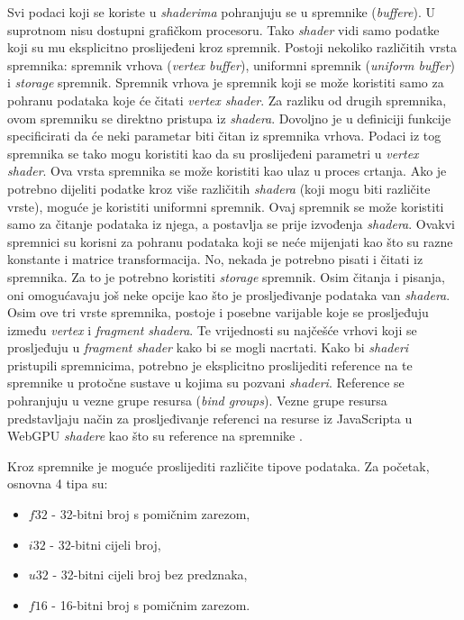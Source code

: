 \documentclass{foi}
\begin{document}
 
Svi podaci koji se koriste u \textit{shaderima} pohranjuju se u spremnike (\textit{buffere}). U suprotnom nisu dostupni grafičkom procesoru. Tako \textit{shader} vidi samo podatke koji su mu eksplicitno proslijeđeni kroz spremnik. Postoji nekoliko različitih vrsta spremnika: spremnik vrhova (\textit{vertex buffer}), uniformni spremnik (\textit{uniform buffer}) i \textit{storage} spremnik. Spremnik vrhova je spremnik koji se može koristiti samo za pohranu podataka koje će čitati \textit{vertex shader}. Za razliku od drugih spremnika, ovom spremniku se direktno pristupa iz \textit{shadera}. Dovoljno je u definiciji funkcije specificirati da će neki parametar biti čitan iz spremnika vrhova. Podaci iz tog spremnika se tako mogu koristiti kao da su proslijeđeni parametri u \textit{vertex shader}. Ova vrsta spremnika se može koristiti kao ulaz u proces crtanja. Ako je potrebno dijeliti podatke kroz više različitih \textit{shadera} (koji mogu biti različite vrste), moguće je koristiti uniformni spremnik. Ovaj spremnik se može koristiti samo za čitanje podataka iz njega, a postavlja se prije izvođenja \textit{shadera}. Ovakvi spremnici su korisni za pohranu podataka koji se neće mijenjati kao što su razne konstante i matrice transformacija. No, nekada je potrebno pisati i čitati iz spremnika. Za to je potrebno koristiti \textit{storage} spremnik. Osim čitanja i pisanja, oni omogućavaju još neke opcije kao što je prosljeđivanje podataka van \textit{shadera}.  Osim ove tri vrste spremnika, postoje i posebne varijable koje se prosljeđuju između \textit{vertex} i \textit{fragment shadera}. Te vrijednosti su najčešće vrhovi koji se prosljeđuju u \textit{fragment shader} kako bi se mogli nacrtati. Kako bi \textit{shaderi} pristupili spremnicima, potrebno je eksplicitno proslijediti reference na te spremnike u protočne sustave u kojima su pozvani \textit{shaderi}. Reference se pohranjuju u vezne grupe resursa (\textit{bind groups}). Vezne grupe resursa predstavljaju način za prosljeđivanje referenci na resurse iz JavaScripta u WebGPU \textit{shadere} kao što su reference na spremnike \parencite{BufferTypes}. 

Kroz spremnike je moguće proslijediti različite tipove podataka. Za početak, osnovna 4 tipa su:

\begin{itemize}
	\item $f32$ - 32-bitni broj s pomičnim zarezom,
	\item $i32$ - 32-bitni cijeli broj,
	\item $u32$ - 32-bitni cijeli broj bez predznaka,
	\item $f16$ - 16-bitni broj s pomičnim zarezom.

\end{itemize}
\end{document}
